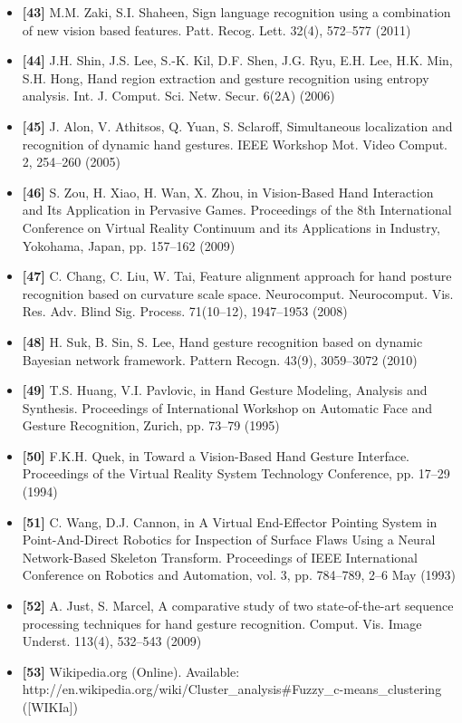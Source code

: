 \documentclass[12pt, a4paper]{article}
\begin{document}
\begin{itemize}[label=]
    \item \textbf{[43]} M.M. Zaki, S.I. Shaheen, Sign language recognition using a combination of new vision based features. Patt. Recog. Lett. 32(4), 572–577 (2011)
    \item \textbf{[44]} J.H. Shin, J.S. Lee, S.-K. Kil, D.F. Shen, J.G. Ryu, E.H. Lee, H.K. Min, S.H. Hong, Hand region extraction and gesture recognition using entropy analysis. Int. J. Comput. Sci. Netw. Secur. 6(2A) (2006)
    \item \textbf{[45]} J. Alon, V. Athitsos, Q. Yuan, S. Sclaroff, Simultaneous localization and recognition of dynamic hand gestures. IEEE Workshop Mot. Video Comput. 2, 254–260 (2005)
    \item \textbf{[46]} S. Zou, H. Xiao, H. Wan, X. Zhou, in Vision-Based Hand Interaction and Its Application in Pervasive Games. Proceedings of the 8th International Conference on Virtual Reality Continuum and its Applications in Industry, Yokohama, Japan, pp. 157–162 (2009)
    \item \textbf{[47]} C. Chang, C. Liu, W. Tai, Feature alignment approach for hand posture recognition based on curvature scale space. Neurocomput. Neurocomput. Vis. Res. Adv. Blind Sig. Process. 71(10–12), 1947–1953 (2008)
    \item \textbf{[48]} H. Suk, B. Sin, S. Lee, Hand gesture recognition based on dynamic Bayesian network framework. Pattern Recogn. 43(9), 3059–3072 (2010)
    \item \textbf{[49]} T.S. Huang, V.I. Pavlovic, in Hand Gesture Modeling, Analysis and Synthesis. Proceedings of International Workshop on Automatic Face and Gesture Recognition, Zurich, pp. 73–79 (1995)
    \item \textbf{[50]} F.K.H. Quek, in Toward a Vision-Based Hand Gesture Interface. Proceedings of the Virtual Reality System Technology Conference, pp. 17–29 (1994)
    \item \textbf{[51]} C. Wang, D.J. Cannon, in A Virtual End-Effector Pointing System in Point-And-Direct Robotics for Inspection of Surface Flaws Using a Neural Network-Based Skeleton Transform. Proceedings of IEEE International Conference on Robotics and Automation, vol. 3, pp. 784–789, 2–6 May (1993)
    \item \textbf{[52]} A. Just, S. Marcel, A comparative study of two state-of-the-art sequence processing techniques for hand gesture recognition. Comput. Vis. Image Underst. 113(4), 532–543 (2009)
    \item \textbf{[53]} Wikipedia.org (Online). Available: http://en.wikipedia.org/wiki/Cluster\_analysis\#Fuzzy\_c-means\_clustering ([WIKIa])

\end{itemize}
\end{document}
